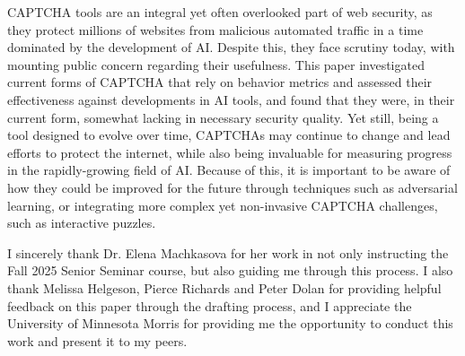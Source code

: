 \documentclass[sigplan,screen,nonacm]{acmart-tagged}
\begin{document}
CAPTCHA tools are an integral yet often overlooked part of web security, as they protect millions of websites from malicious automated traffic in a time dominated by the development of AI. Despite this, they face scrutiny today, with mounting public concern regarding their usefulness. This paper investigated current forms of CAPTCHA that rely on behavior metrics and assessed their effectiveness against developments in AI tools, and found that they were, in their current form, somewhat lacking in necessary security quality. Yet still, being a tool designed to evolve over time, CAPTCHAs may continue to change and lead efforts to protect the internet, while also being invaluable for measuring progress in the rapidly-growing field of AI. Because of this, it is important to be aware of how they could be improved for the future through techniques such as adversarial learning, or integrating more complex yet non-invasive CAPTCHA challenges, such as interactive puzzles.

\begin{acks}
I sincerely thank Dr. Elena Machkasova for her work in not only instructing the Fall 2025 Senior Seminar course, but also guiding me through this process. I also thank Melissa Helgeson, Pierce Richards and Peter Dolan for providing helpful feedback on this paper through the drafting process, and I appreciate the University of Minnesota Morris for providing me the opportunity to conduct this work and present it to my peers.
\end{acks}



\end{document}
